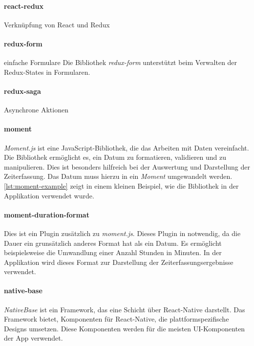 \paragraph{react-redux}

Verknüpfung von React und Redux

\paragraph{redux-form}
einfache Formulare
Die Bibliothek \textit{redux-form} unterstützt beim Verwalten der Redux-States in Formularen.

\paragraph{redux-saga}
Asynchrone Aktionen

\paragraph{moment}
\textit{Moment.js} ist eine JavaScript-Bibliothek, die das Arbeiten mit Daten vereinfacht. Die Bibliothek ermöglicht es,
ein Datum zu formatieren, validieren und zu manipulieren. Dies ist besonders hilfreich bei der Auswertung und Darstellung der
Zeiterfassung. Das Datum muss hierzu in ein \textit{Moment} umgewandelt werden. \autoref{lst:moment-example} zeigt in einem kleinen Beispiel,
wie die Bibliothek in der Applikation verwendet wurde.


\paragraph{moment-duration-format}
Dies ist ein Plugin zusätzlich zu \textit{moment.js}. Dieses Plugin in notwendig, da die Dauer ein
grunsätzlich anderes Format hat als ein Datum. Es ermöglicht beispielsweise die Umwandlung einer Anzahl Stunden in Minuten.
In der Applikation wird dieses Format zur Darstellung der Zeiterfassungsergebnisse verwendet.



\paragraph{native-base}
\textit{NativeBase} ist ein Framework, das eine Schicht über React-Native darstellt. Das Framework bietet,
Komponenten für React-Native, die plattformspezifische Designs umsetzen. Diese Komponenten werden für die meisten UI-Komponenten der App
verwendet. %